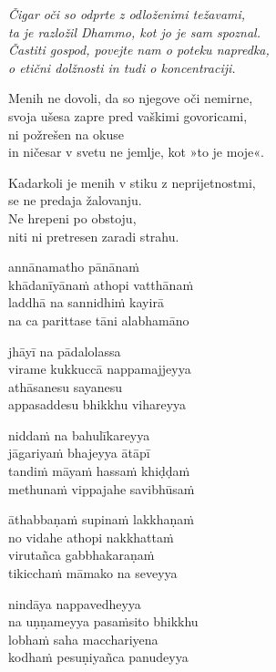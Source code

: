 \emph{Čigar oči so odprte z odloženimi težavami,}\\
\emph{ta je razložil Dhammo, kot jo je sam spoznal.}\\
\emph{Častiti gospod, povejte nam o poteku napredka,}\\
\emph{o etični dolžnosti in tudi o koncentraciji.}

Menih ne dovoli, da so njegove oči nemirne,\\
svoja ušesa zapre pred vaškimi govoricami,\\
ni požrešen na okuse\\
in ničesar v svetu ne jemlje, kot »to je moje«.

Kadarkoli je menih v stiku z neprijetnostmi,\\
se ne predaja žalovanju.\\
Ne hrepeni po obstoju,\\
niti ni pretresen zaradi strahu.


\clearpage

annānamatho pānānaṁ\\
khādanīyānaṁ athopi vatthānaṁ\\
laddhā na sannidhiṁ kayirā\\
na ca parittase tāni alabhamāno

jhāyī na pādalolassa\\
virame kukkuccā nappamajjeyya\\
athāsanesu sayanesu\\
appasaddesu bhikkhu vihareyya

niddaṁ na bahulīkareyya\\
jāgariyaṁ bhajeyya ātāpī\\
tandiṁ māyaṁ hassaṁ khiḍḍaṁ\\
methunaṁ vippajahe savibhūsaṁ

āthabbaṇaṁ supinaṁ lakkhaṇaṁ\\
no vidahe athopi nakkhattaṁ\\
virutañca gabbhakaraṇaṁ\\
tikicchaṁ māmako na seveyya

nindāya nappavedheyya\\
na uṇṇameyya pasaṁsito bhikkhu\\
lobhaṁ saha macchariyena\\
kodhaṁ pesuṇiyañca panudeyya


